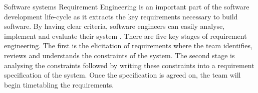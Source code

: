 \documentclass{article}
\begin{document}
	Software systems Requirement Engineering is an important part of the software development life-cycle as it extracts the key requirements necessary to build software. 
	By having clear criteria, software engineers can easily analyse, implement and evaluate their system \cite{nuseibeh2000requirements}. 
	There are five key stages of requirement engineering. The first is the elicitation of requirements where the team identifies, reviews and understands the constraints of the system. 
	The second stage is analysing the constraints followed by writing these constraints into a requirement specification of the system. 
	Once the specification is agreed on, the team will begin timetabling the requirements. 
	
\end{document}
